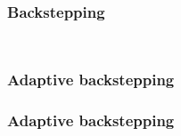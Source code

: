 %
\begin{frame}
\frametitle{Backstepping}
%
\begin{columns}
	\begin{column}{0.5\textwidth}
	\begin{figure}
	\end{figure}
	\end{column}
	\begin{column}{0.5\textwidth}
	\begin{figure}
	\end{figure}
	\end{column}
\end{columns}
\end{frame}
%
%
\subsubsection{Adaptive backstepping}
\begin{frame}
\frametitle{Adaptive backstepping}
\end{frame}
